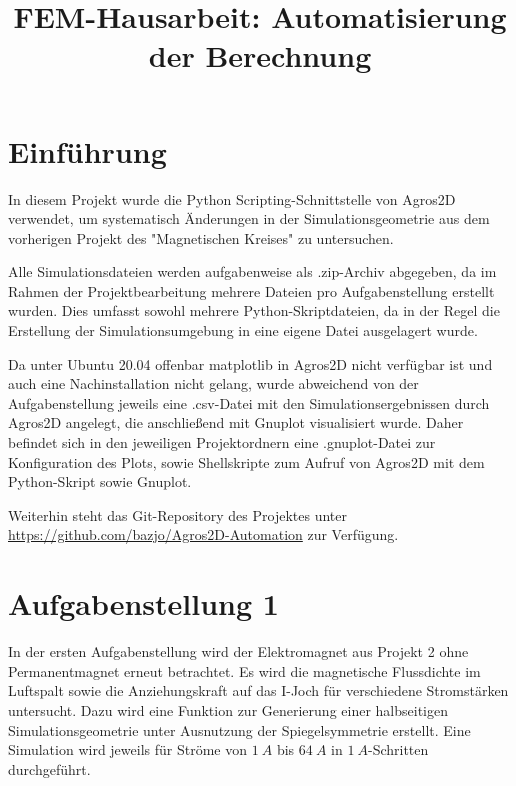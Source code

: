 \documentclass[conference,a4paper,twoside]{IEEEtran}
\begin{document}
\title{FEM-Hausarbeit: Automatisierung der Berechnung}

\author{
}

\maketitle


\section{Einführung}
In diesem Projekt wurde die Python Scripting-Schnittstelle von Agros2D verwendet, um systematisch Änderungen in der Simulationsgeometrie aus dem vorherigen Projekt des "Magnetischen Kreises" zu untersuchen.

Alle Simulationsdateien werden aufgabenweise als .zip-Archiv abgegeben, da im Rahmen der Projektbearbeitung mehrere Dateien pro Aufgabenstellung erstellt wurden. Dies umfasst sowohl mehrere Python-Skriptdateien, da in der Regel die Erstellung der Simulationsumgebung in eine eigene Datei ausgelagert wurde.

Da unter Ubuntu 20.04 offenbar matplotlib in Agros2D nicht verfügbar ist und auch eine Nachinstallation nicht gelang, wurde abweichend von der Aufgabenstellung jeweils eine .csv-Datei mit den Simulationsergebnissen durch Agros2D angelegt, die anschließend mit Gnuplot visualisiert wurde. Daher befindet sich in den jeweiligen Projektordnern eine .gnuplot-Datei zur Konfiguration des Plots, sowie Shellskripte zum Aufruf von Agros2D mit dem Python-Skript sowie Gnuplot.

Weiterhin steht das Git-Repository des Projektes unter \url{https://github.com/bazjo/Agros2D-Automation} zur Verfügung.

\section{Aufgabenstellung 1}
In der ersten Aufgabenstellung wird der Elektromagnet aus Projekt 2 ohne Permanentmagnet erneut betrachtet. Es wird die magnetische Flussdichte im Luftspalt sowie die Anziehungskraft auf das I-Joch für verschiedene Stromstärken untersucht. Dazu wird eine Funktion zur Generierung einer halbseitigen Simulationsgeometrie unter Ausnutzung der Spiegelsymmetrie erstellt. Eine Simulation wird jeweils für Ströme von $1\ A$ bis $64\ A$ in $1\ A$-Schritten durchgeführt.
\end{document}
